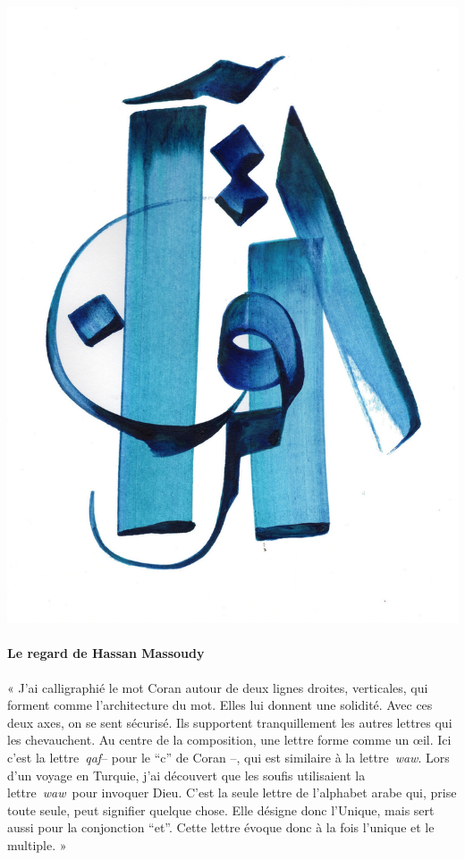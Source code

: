 \includegraphics[width=\textwidth]{Images/image017.jpg}


\paragraph{Le regard de Hassan Massoudy}
\begin{cite}
« J'ai calligraphié le mot Coran autour de deux lignes droites,
verticales, qui forment comme l'architecture du mot. Elles lui donnent
une solidité. Avec ces deux axes, on se sent sécurisé. Ils supportent
tranquillement les autres lettres qui les chevauchent. Au centre de la
composition, une lettre forme comme un œil. Ici c'est la
lettre~\emph{qaf}-- pour le ``c'' de Coran --, qui est similaire à la
lettre~\emph{waw}. Lors d'un voyage en Turquie, j'ai découvert que les
soufis utilisaient la lettre~\emph{waw}~pour invoquer Dieu. C'est la
seule lettre de l'alphabet arabe qui, prise toute seule, peut signifier
quelque chose. Elle désigne donc l'Unique, mais sert aussi pour la
conjonction ``et''. Cette lettre évoque donc à la fois l'unique et le
multiple. »
\end{cite}



